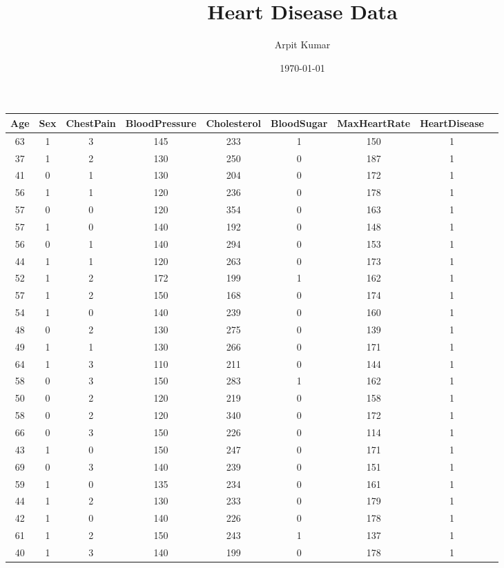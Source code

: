 \documentclass{article}
\title{Heart Disease Data}
\author{Arpit Kumar}
\date{\today}
\begin{document}
\maketitle
\begin{longtable}{
|
c|c|c|c|c|c|c|c|c|}
\hline
Age & Sex & ChestPain & BloodPressure & Cholesterol & BloodSugar & MaxHeartRate & HeartDisease \\
\hline
\endfirsthead
\hline
63 & 1 & 3 & 145 & 233 & 1 & 150 & 1 \\
\hline
37 & 1 & 2 & 130 & 250 & 0 & 187 & 1 \\
\hline
41 & 0 & 1 & 130 & 204 & 0 & 172 & 1 \\
\hline
56 & 1 & 1 & 120 & 236 & 0 & 178 & 1 \\
\hline
57 & 0 & 0 & 120 & 354 & 0 & 163 & 1 \\
\hline
57 & 1 & 0 & 140 & 192 & 0 & 148 & 1 \\
\hline
56 & 0 & 1 & 140 & 294 & 0 & 153 & 1 \\
\hline
44 & 1 & 1 & 120 & 263 & 0 & 173 & 1 \\
\hline
52 & 1 & 2 & 172 & 199 & 1 & 162 & 1 \\
\hline
57 & 1 & 2 & 150 & 168 & 0 & 174 & 1 \\
\hline
54 & 1 & 0 & 140 & 239 & 0 & 160 & 1 \\
\hline
48 & 0 & 2 & 130 & 275 & 0 & 139 & 1 \\
\hline
49 & 1 & 1 & 130 & 266 & 0 & 171 & 1 \\
\hline
64 & 1 & 3 & 110 & 211 & 0 & 144 & 1 \\
\hline
58 & 0 & 3 & 150 & 283 & 1 & 162 & 1 \\
\hline
50 & 0 & 2 & 120 & 219 & 0 & 158 & 1 \\
\hline
58 & 0 & 2 & 120 & 340 & 0 & 172 & 1 \\
\hline
66 & 0 & 3 & 150 & 226 & 0 & 114 & 1 \\
\hline
43 & 1 & 0 & 150 & 247 & 0 & 171 & 1 \\
\hline
69 & 0 & 3 & 140 & 239 & 0 & 151 & 1 \\
\hline
59 & 1 & 0 & 135 & 234 & 0 & 161 & 1 \\
\hline
44 & 1 & 2 & 130 & 233 & 0 & 179 & 1 \\
\hline
42 & 1 & 0 & 140 & 226 & 0 & 178 & 1 \\
\hline
61 & 1 & 2 & 150 & 243 & 1 & 137 & 1 \\
\hline
40 & 1 & 3 & 140 & 199 & 0 & 178 & 1 \\
\hline

\end{longtable}
\end{document}
